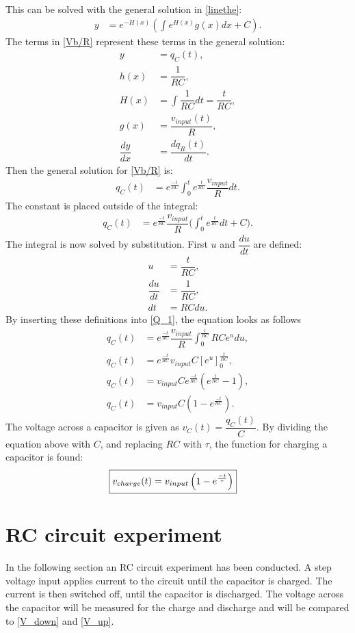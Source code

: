This can be solved with the general solution in \cref{linethe}:
\begin{align*}
y&=e^{-H(x)}\left(\int e^{H(x)}g(x)dx+C\right).
\end{align*}
The terms in \eqref{Vb/R} represent these terms in the general solution:
\begin{align*}
y &= q_C(t),
\\
h(x) &= \dfrac{1}{RC},
\\
H(x) &= \int \dfrac{1}{RC}dt=\dfrac{t}{RC},
\\
g(x) &= \dfrac{v_{input}(t)}{R},
\\
\dfrac{dy}{dx} &= \dfrac{dq_R(t)}{dt}.
\end{align*}
Then the general solution for \eqref{Vb/R} is:
\begin{align*}
q_C(t) &= e^{\frac{-t}{RC}}\int_{0}^{t}e^{\frac{t}{RC}}\dfrac{v_{input}}{R}dt.
\end{align*}
The constant is placed outside of the integral:
\begin{align}
q_C(t) &= e^{\frac{-t}{RC}}\dfrac{v_{input}}{R}\bigg(\int_{0}^{t}e^{\frac{t}{RC}}dt+C \bigg). \label{Q_1}
\end{align}
The integral is now solved by substitution. First $u$ and $\dfrac{du}{dt}$ are defined:
\begin{align*}
u &= \dfrac{t}{RC},
\\
\dfrac{du}{dt}&=\dfrac{1}{RC},
\\
dt &=RC du.
\end{align*} 
By inserting these definitions into \eqref{Q_1}, the equation looks as follows
\begin{align*}
q_C(t) &= e^{\frac{-t}{RC}}  \dfrac{v_{input}}{R} \int_{0}^{\frac{t}{RC}} R  C  e^u du,
\\
q_C(t) &= e^{\frac{-t}{RC}} v_{input} C \left[e^u\right]_{0}^{\frac{t}{RC}},
\\
q_C(t) &= v_{input}  C e^{\frac{-t}{RC}}\left(e^{\frac{t}{RC}}-1\right),
\\
q_C(t) &= v_{input}  C  \left(1-e^{\frac{-t}{RC}}\right).
\end{align*} 
The voltage across a capacitor is given as $v_C(t)=\dfrac{q_C(t)}{C}$. By dividing the equation above with $C$, and replacing $RC$ with $\tau$, the function for charging a capacitor is found:
\begin{align}
\label{V_up}
\Aboxed{
v_{charge}(t)=v_{input}\left(1-e^{\frac{-t}{\tau}}\right)
}
\end{align}
\section{RC circuit experiment} \label{c: RC_exp}
In the following section an RC circuit experiment has been conducted. A step voltage input applies current to the circuit until the capacitor is charged. The current is then switched off, until the capacitor is discharged. The voltage across the capacitor will be measured for the charge and discharge and will be compared to \eqref{V_down} and \eqref{V_up}.

